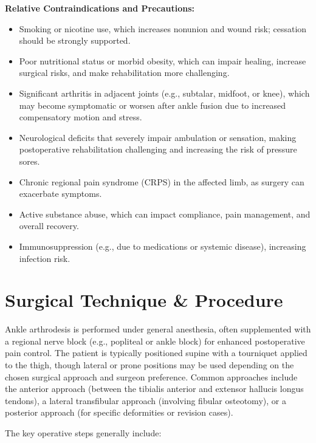 \textbf{Relative Contraindications and Precautions:}
\begin{itemize}
  \item Smoking or nicotine use, which increases nonunion and wound risk; cessation should be strongly supported.
  
  \item Poor nutritional status or morbid obesity, which can impair healing, increase surgical risks, and make rehabilitation more challenging.
  
  \item Significant arthritis in adjacent joints (e.g., subtalar, midfoot, or knee), which may become symptomatic or worsen after ankle fusion due to increased compensatory motion and stress.
  
  \item Neurological deficits that severely impair ambulation or sensation, making postoperative rehabilitation challenging and increasing the risk of pressure sores.
  
  \item Chronic regional pain syndrome (CRPS) in the affected limb, as surgery can exacerbate symptoms.
  
  \item Active substance abuse, which can impact compliance, pain management, and overall recovery.
  
  \item Immunosuppression (e.g., due to medications or systemic disease), increasing infection risk.
\end{itemize}

\section*{Surgical Technique \& Procedure}
Ankle arthrodesis is performed under general anesthesia, often supplemented with a regional nerve block (e.g., popliteal or ankle block) for enhanced postoperative pain control. The patient is typically positioned supine with a tourniquet applied to the thigh, though lateral or prone positions may be used depending on the chosen surgical approach and surgeon preference. Common approaches include the anterior approach (between the tibialis anterior and extensor hallucis longus tendons), a lateral transfibular approach (involving fibular osteotomy), or a posterior approach (for specific deformities or revision cases).

The key operative steps generally include:

